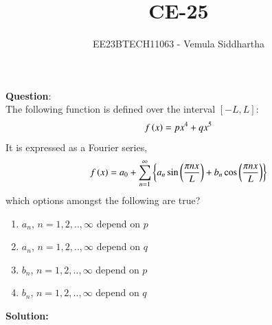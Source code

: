 \documentclass[journal,12pt,twocolumn]{IEEEtran}
\theoremstyle{remark}
\begin{document}

\vspace{3cm}

\title{CE-25}
\author{EE23BTECH11063 - Vemula Siddhartha}
\maketitle
\newpage
\bigskip

\renewcommand{\thefigure}{\theenumi}
\renewcommand{\thetable}{\theenumi}
\textbf{Question}:\\
The following function is defined over the interval $[-L,L]$:
    $$f\left(x\right)=px^4+qx^5$$
It is expressed as a Fourier series,
    $$f\left(x\right)=a_0+\sum_{n=1}^{\infty}\left\{a_n\sin\left(\frac{\pi n x}{L}\right)+b_n\cos\left(\frac{\pi n x}{L}\right)\right\}$$
which options amongst the following are true?
\begin{enumerate}[label=(\alph*)]
    \item $a_n$, $n=1,2,..,\infty$ depend on $p$
    \item $a_n$, $n=1,2,..,\infty$ depend on $q$
    \item $b_n$, $n=1,2,..,\infty$ depend on $p$
    \item $b_n$, $n=1,2,..,\infty$ depend on $q$
\end{enumerate}
\textbf{Solution:}\\
\end{document}
